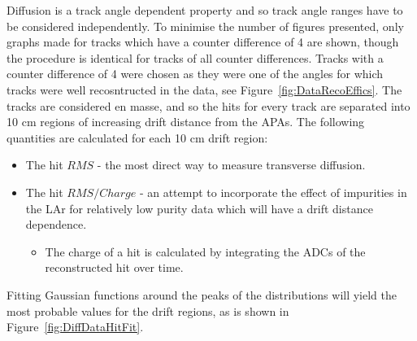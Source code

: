 Diffusion is a track angle dependent property and so track angle ranges have to be considered independently. To minimise the number of figures presented, only graphs made for tracks which have a counter difference of 4 are shown, though the procedure is identical for tracks of all counter differences. Tracks with a counter difference of 4 were chosen as they were one of the angles for which tracks were well recosntructed in the data, see Figure~\ref{fig:DataRecoEffics}. The tracks are considered en masse, and so the hits for every track are separated into 10 cm regions of increasing drift distance from the APAs. The following quantities are calculated for each 10 cm drift region:
\begin{itemize}
\item The hit $RMS$ - the most direct way to measure transverse diffusion.
\item The hit $RMS/Charge$ - an attempt to incorporate the effect of impurities in the LAr for relatively low purity data which will have a drift distance dependence.
  \begin{itemize}
  \item The charge of a hit is calculated by integrating the ADCs of the reconstructed hit over time. 
  \end{itemize}
\end{itemize}
Fitting Gaussian functions around the peaks of the distributions will yield the most probable values for the drift regions, as is shown in Figure~\ref{fig:DiffDataHitFit}. \\

